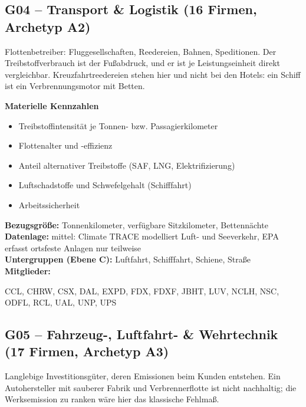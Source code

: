 \medskip
\subsection*{G04 -- Transport \& Logistik \normalfont\small (16 Firmen, Archetyp A2)}
\noindent Flottenbetreiber: Fluggesellschaften, Reedereien, Bahnen, Speditionen. Der Treibstoffverbrauch ist der Fußabdruck, und er ist je Leistungseinheit direkt vergleichbar. Kreuzfahrtreedereien stehen hier und nicht bei den Hotels: ein Schiff ist ein Verbrennungsmotor mit Betten.

\noindent\textbf{Materielle Kennzahlen}
\begin{itemize}[nosep,leftmargin=1.2em]
  \item Treibstoffintensität je Tonnen- bzw. Passagierkilometer
  \item Flottenalter und -effizienz
  \item Anteil alternativer Treibstoffe (SAF, LNG, Elektrifizierung)
  \item Luftschadstoffe und Schwefelgehalt (Schifffahrt)
  \item Arbeitssicherheit
\end{itemize}
\noindent\textbf{Bezugsgröße:} Tonnenkilometer, verfügbare Sitzkilometer, Bettennächte\\
\textbf{Datenlage:} mittel: Climate TRACE modelliert Luft- und Seeverkehr, EPA erfasst ortsfeste Anlagen nur teilweise\\
\textbf{Untergruppen (Ebene C):} Luftfahrt, Schifffahrt, Schiene, Straße\\
\textbf{Mitglieder:} {\raggedright\small\ttfamily CCL, CHRW, CSX, DAL, EXPD, FDX, FDXF, JBHT, LUV, NCLH, NSC, ODFL, RCL, UAL, UNP, UPS\par}

\medskip
\subsection*{G05 -- Fahrzeug-, Luftfahrt- \& Wehrtechnik \normalfont\small (17 Firmen, Archetyp A3)}
\noindent Langlebige Investitionsgüter, deren Emissionen beim Kunden entstehen. Ein Autohersteller mit sauberer Fabrik und Verbrennerflotte ist nicht nachhaltig; die Werksemission zu ranken wäre hier das klassische Fehlmaß.

